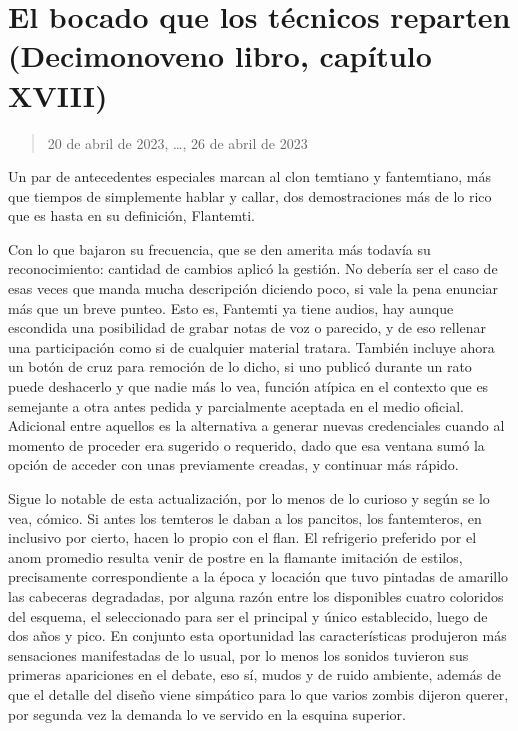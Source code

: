 \documentclass[
]{book}
\begin{document}
\hypertarget{el-bocado-que-los-tuxe9cnicos-reparten-decimonoveno-libro-capuxedtulo-xviii}{%
\section{El bocado que los técnicos reparten (Decimonoveno libro, capítulo XVIII)}\label{el-bocado-que-los-tuxe9cnicos-reparten-decimonoveno-libro-capuxedtulo-xviii}}

\begin{quote}
20 de abril de 2023, \ldots, 26 de abril de 2023
\end{quote}

Un par de antecedentes especiales marcan al clon temtiano y fantemtiano, más que tiempos de simplemente hablar y callar, dos demostraciones más de lo rico que es hasta en su definición, Flantemti.

Con lo que bajaron su frecuencia, que se den amerita más todavía su reconocimiento: cantidad de cambios aplicó la gestión. No debería ser el caso de esas veces que manda mucha descripción diciendo poco, si vale la pena enunciar más que un breve punteo. Esto es, Fantemti ya tiene audios, hay aunque escondida una posibilidad de grabar notas de voz o parecido, y de eso rellenar una participación como si de cualquier material tratara. También incluye ahora un botón de cruz para remoción de lo dicho, si uno publicó durante un rato puede deshacerlo y que nadie más lo vea, función atípica en el contexto que es semejante a otra antes pedida y parcialmente aceptada en el medio oficial. Adicional entre aquellos es la alternativa a generar nuevas credenciales cuando al momento de proceder era sugerido o requerido, dado que esa ventana sumó la opción de acceder con unas previamente creadas, y continuar más rápido.

Sigue lo notable de esta actualización, por lo menos de lo curioso y según se lo vea, cómico. Si antes los temteros le daban a los pancitos, los fantemteros, en inclusivo por cierto, hacen lo propio con el flan. El refrigerio preferido por el anom promedio resulta venir de postre en la flamante imitación de estilos, precisamente correspondiente a la época y locación que tuvo pintadas de amarillo las cabeceras degradadas, por alguna razón entre los disponibles cuatro coloridos del esquema, el seleccionado para ser el principal y único establecido, luego de dos años y pico. En conjunto esta oportunidad las características produjeron más sensaciones manifestadas de lo usual, por lo menos los sonidos tuvieron sus primeras apariciones en el debate, eso sí, mudos y de ruido ambiente, además de que el detalle del diseño viene simpático para lo que varios zombis dijeron querer, por segunda vez la demanda lo ve servido en la esquina superior.
\end{document}
